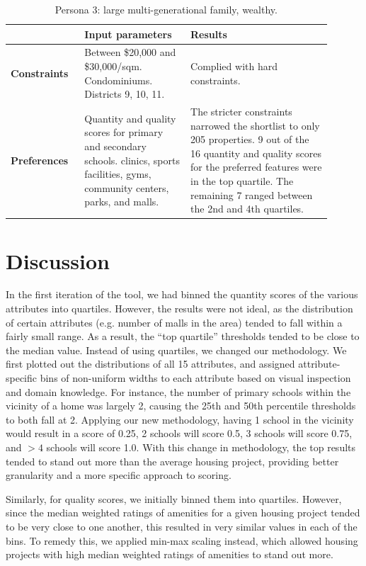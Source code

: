 \documentclass[a4paper, 11pt]{article}
\begin{document}
\begin{table}[ht]
    \centering
    \begin{tabular}{p{0.2\linewidth} | p{0.3\linewidth} | p{0.4\linewidth}} \hline
      & \textbf{Input parameters}  & \textbf{Results} \\ \hline
      \textbf{Constraints}& Between \$20,000 and \$30,000/sqm. Condominiums. Districts 9, 10, 11.
 & Complied with hard constraints. \\ \hline
\textbf{Preferences} & 
Quantity and quality scores for primary and secondary schools. clinics, sports facilities, gyms, community centers, parks, and malls. & The stricter constraints narrowed the shortlist to only 205 properties.
9 out of the 16 quantity and quality scores for the preferred features were in the top quartile. The remaining 7 ranged between the 2nd and 4th quartiles. 

 \\\hline
    \end{tabular}
    \caption{Persona 3: large multi-generational family, wealthy.
}
    \label{tab:my_label}
\end{table}


\section{Discussion}

In the first iteration of the tool, we had binned the quantity scores of the various attributes into quartiles. However, the results were not ideal, as the distribution of certain attributes (e.g. number of malls in the area) tended to fall within a fairly small range. As a result, the “top quartile” thresholds tended to be close to the median value. Instead of using quartiles, we changed our methodology. We first plotted out the distributions of all 15 attributes, and assigned attribute-specific bins of non-uniform widths to each attribute based on visual inspection and domain knowledge. For instance, the number of primary schools within the vicinity of a home was largely 2, causing the 25th and 50th percentile thresholds to both fall at 2. Applying our new methodology, having 1 school in the vicinity would result in a score of 0.25, 2 schools will score 0.5, 3 schools will score 0.75, and $>4$ schools will score 1.0. With this change in methodology, the top results tended to stand out more than the average housing project, providing better granularity and a more specific approach to scoring.

Similarly, for quality scores, we initially binned them into quartiles. However, since the median weighted ratings of amenities for a given housing project tended to be very close to one another, this resulted in very similar values in each of the bins. To remedy this, we applied min-max scaling instead, which allowed housing projects with high median weighted ratings of amenities to stand out more.
\end{document}
